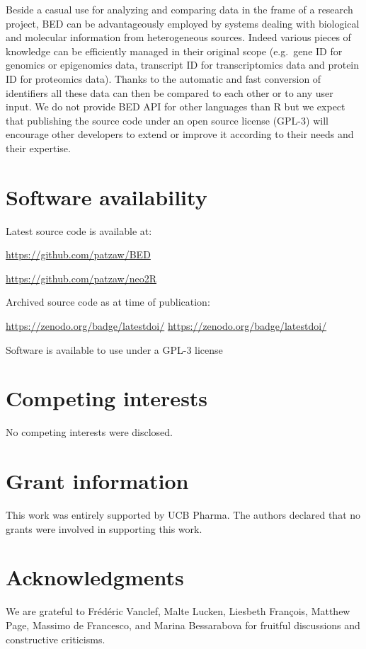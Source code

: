 \documentclass[9pt,a4paper,]{extarticle}
\theoremstyle{definition}
\theoremstyle{definition}
\theoremstyle{definition}
\theoremstyle{remark}
\begin{document}
Beside a casual use for analyzing and comparing data in the frame of a
research project, BED can be advantageously employed by systems dealing with
biological and molecular information from heterogeneous sources.
Indeed various pieces of knowledge can be efficiently managed
in their original scope
(e.g.~gene ID for genomics or epigenomics data, transcript ID
for transcriptomics data and protein ID for proteomics data).
Thanks to the automatic and fast conversion of identifiers all these
data can then be compared to each other or to any user input.
We do not provide BED API for other languages than R but we expect that
publishing the source code under an open source license (GPL-3)
will encourage other developers to extend or improve it according to their
needs and their expertise.

\section{Software availability}\label{software-availability}

Latest source code is available at:

\url{https://github.com/patzaw/BED}

\url{https://github.com/patzaw/neo2R}

Archived source code as at time of publication:

\url{https://zenodo.org/badge/latestdoi/}
\url{https://zenodo.org/badge/latestdoi/}

Software is available to use under a GPL-3 license

\section{Competing interests}\label{competing-interests}

No competing interests were disclosed.

\section{Grant information}\label{grant-information}

This work was entirely supported by UCB Pharma.
The authors declared that no grants were involved in supporting this work.

\section{Acknowledgments}\label{acknowledgments}

We are grateful to Frédéric Vanclef, Malte Lucken, Liesbeth François,
Matthew Page,
Massimo de Francesco, and Marina Bessarabova for fruitful discussions
and constructive criticisms.

{\small}
\end{document}
